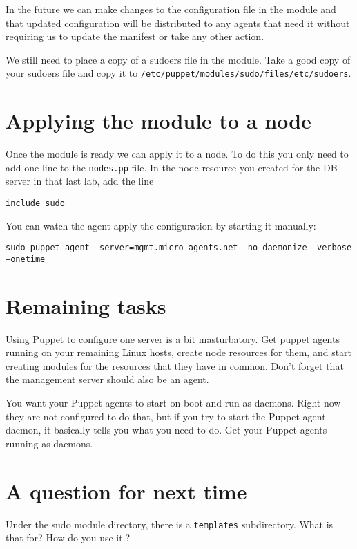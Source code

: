 \documentclass{article}   	%
\begin{document}
In the future we can make changes to the configuration file in the module and that updated configuration will be distributed to any agents that need it without requiring us to update the manifest or take any other action.

We still need to place a copy of a sudoers file in the module.  Take a good copy of your sudoers file and copy it to \texttt{/etc/puppet/modules/sudo/files/etc/sudoers}.

\section*{Applying the module to a node}
Once the module is ready we can apply it to a node.  To do this you only need to add one line to the \texttt{nodes.pp} file.  In the node resource you created for the DB server in that last lab, add the line

\texttt{include sudo}

You can watch the agent apply the configuration by starting it manually:

\texttt{sudo puppet agent --server=mgmt.micro-agents.net --no-daemonize --verbose --onetime}

\section*{Remaining tasks}
Using Puppet to configure one server is a bit masturbatory.  Get puppet agents running on your remaining Linux hosts, create node resources for them, and start creating modules for the resources that they have in common.  Don't forget that the management server should also be an agent.

You want your Puppet agents to start on boot and run as daemons.  Right now they are not configured to do that, but if you try to start the Puppet agent daemon, it basically tells you what you need to do.  Get your Puppet agents running as daemons. 

\section*{A question for next time}
Under the sudo module directory, there is a \texttt{templates} subdirectory.  What is that for?  How do you use it.?
\end{document}
